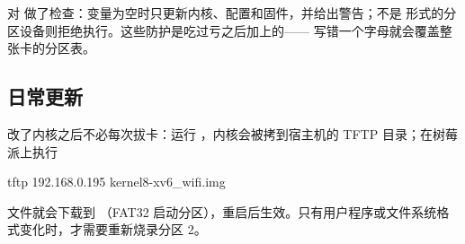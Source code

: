  对  做了检查：变量为空时只更新内核、配置和固件，并给出警告；不是  形式的分区设备则拒绝执行。这些防护是吃过亏之后加上的—— 写错一个字母就会覆盖整张卡的分区表。

\subsection{日常更新}

改了内核之后不必每次拔卡：运行 ，内核会被拷到宿主机的 TFTP 目录；在树莓派上执行

\begin{shcode}
tftp 192.168.0.195 kernel8-xv6_wifi.img
\end{shcode}

文件就会下载到 （FAT32 启动分区），重启后生效。只有用户程序或文件系统格式变化时，才需要重新烧录分区 2。
